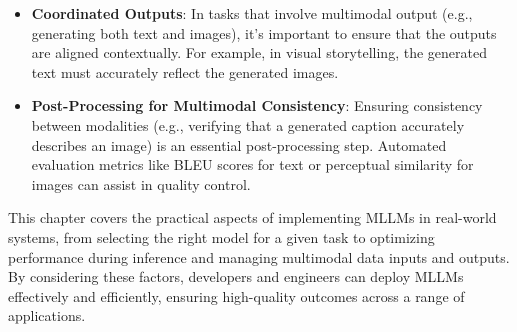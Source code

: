 \begin{itemize}
\begin{itemize}
        \item \textbf{Coordinated Outputs}: In tasks that involve multimodal output (e.g., generating both text and images), it's important to ensure that the outputs are aligned contextually. For example, in visual storytelling, the generated text must accurately reflect the generated images.
        \item \textbf{Post-Processing for Multimodal Consistency}: Ensuring consistency between modalities (e.g., verifying that a generated caption accurately describes an image) is an essential post-processing step. Automated evaluation metrics like BLEU scores for text or perceptual similarity for images can assist in quality control.
    \end{itemize}
\end{itemize}

This chapter covers the practical aspects of implementing MLLMs in real-world systems, from selecting the right model for a given task to optimizing performance during inference and managing multimodal data inputs and outputs. By considering these factors, developers and engineers can deploy MLLMs effectively and efficiently, ensuring high-quality outcomes across a range of applications.
